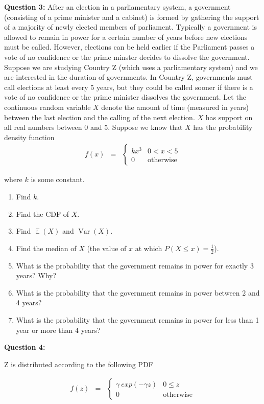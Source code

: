 \documentclass[11pt]{article}
\DeclareMathOperator*{\E}{\mathbb{E}}
\DeclareMathOperator*{\V}{Var}
\begin{document}
\bigskip

\noindent \textbf{Question 3:} After an election in a parliamentary system, a government (consisting of a prime minister and a cabinet) is formed by gathering the support of a majority of newly elected members of parliament. Typically a government is allowed to remain in power for a certain number of years before new elections must be called. However, elections can be held earlier if the Parliament passes a vote of no confidence or the prime minster decides to dissolve the government. Suppose we are studying Country Z (which uses a parliamentary system) and we are interested in the duration of governments. In Country Z, governments must call elections at least every 5 years, but they could be called sooner if there is a vote of no confidence or the prime minister dissolves the government. Let the continuous random variable $X$ denote the amount of time (measured in years) between the last election and the calling of the next election. $X$ has support on all real numbers between 0 and 5. Suppose we know that $X$ has the probability density function
\begin{eqnarray*}
f(x) &=& \begin{cases}
kx^3 &  0 < x < 5 \\
0 & \text{otherwise}
\end{cases}
\end{eqnarray*}

\noindent where $k$ is some constant.
 
\begin{enumerate}
\item Find $k$.
\item Find the CDF of $X$.
\item Find $\E(X)$ and $\V(X)$.
\item Find the median of $X$ (the value of $x$ at which $P(X \leq x) = \frac{1}{2}$).
\item What is the probability that the government remains in power for exactly 3 years? Why?
\item What is the probability that the government remains in power between 2 and 4 years?
\item What is the probability that the government remains in power for less than 1 year or more than 4 years?
\end{enumerate}

\noindent \textbf{Question 4:} 

Z is distributed according to the following PDF

\begin{eqnarray*}
f(z) &=& \begin{cases}
\gamma \ exp(-\gamma z) &  0 \le z \\
0 & \text{otherwise}
\end{cases}
\end{eqnarray*}
\end{document}
